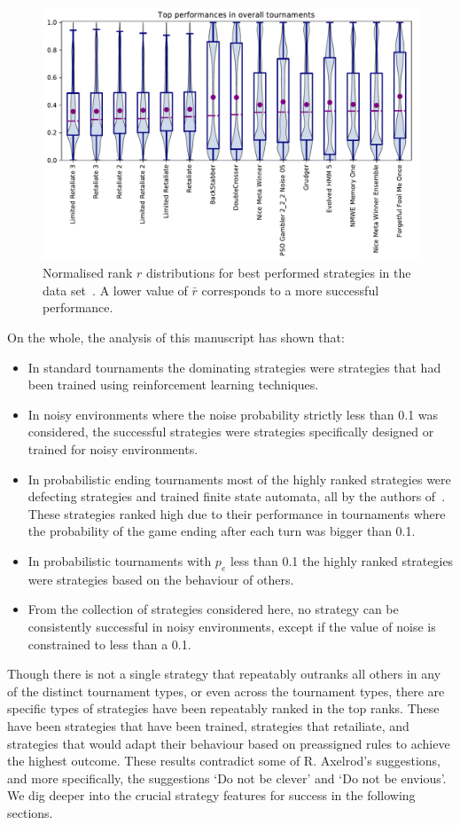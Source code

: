 \documentclass{article}
\begin{document}
\begin{figure}[!htbp]
        \centering
        \includegraphics[width=.65\textwidth]{../images/performance_merged.pdf}
        \caption{Normalised rank \(r\) distributions for best performed strategies in the data set~\cite{data}.
        A lower value of \(\bar{r}\) corresponds to a more successful
        performance.}
        \label{fig:overall_results}
\end{figure}

On the whole, the analysis of this manuscript has shown that:

\begin{itemize}
    \item In standard tournaments the dominating strategies were
    strategies that had been trained using reinforcement learning techniques.
    \item In noisy environments where the noise probability strictly less than
    0.1 was considered, the successful strategies were strategies specifically
    designed or trained for noisy environments.
    \item In probabilistic ending tournaments most of the highly ranked
    strategies were defecting strategies and trained finite state automata, all
    by the authors of~\cite{Ashlock2006, Ashlock2014}. These strategies ranked
    high due to their performance in tournaments where the probability of the
    game ending after each turn was bigger than 0.1.
    \item In probabilistic tournaments with \(p_e\) less than 0.1 the highly
    ranked strategies were strategies based on the behaviour of others.
    \item From the collection of strategies considered here,  no strategy can be
    consistently successful in noisy environments, except if the value of noise
    is constrained to less than a 0.1.
\end{itemize}

Though there is not a single strategy that repeatably outranks all others in any
of the distinct tournament types, or even across the tournament types, there
are specific types of strategies have been repeatably ranked in the top ranks.
These have been strategies that have been trained, strategies that retailiate,
and strategies that would adapt their behaviour based on preassigned rules
to achieve the highest outcome. These results contradict some of R. Axelrod's suggestions,
and more specifically, the suggestions `Do not be clever' and `Do not be envious'.
We dig deeper into the crucial strategy features for success in the following sections.
\end{document}
